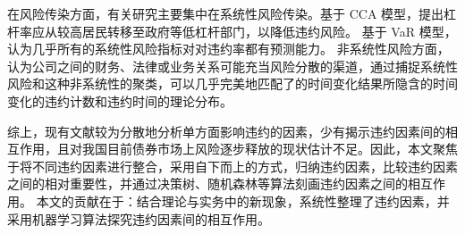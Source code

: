 在风险传染方面，有关研究主要集中在系统性风险传染。\Textcite{苟文均2016债务杠杆与系统性风险传染机制}基于 CCA 模型，提出杠杆率应从较高居民转移至政府等低杠杆部门，以降低违约风险。
\Textcite{2020Do}基于 VaR 模型，认为几乎所有的系统性风险指标对对违约率都有预测能力。
非系统性风险方面，\Textcite{azizpour2018exploring}认为公司之间的财务、法律或业务关系可能充当风险分散的渠道，通过捕捉系统性风险和这种非系统性的聚类，可以几乎完美地匹配了的时间变化结果所隐含的时间变化的违约计数和违约时间的理论分布。

综上，现有文献较为分散地分析单方面影响违约的因素，少有揭示违约因素间的相互作用，且对我国目前债券市场上风险逐步释放的现状估计不足。因此，本文聚焦于将不同违约因素进行整合，采用自下而上的方式，归纳违约因素，比较违约因素之间的相对重要性，并通过决策树、随机森林等算法刻画违约因素之间的相互作用。
本文的贡献在于：结合理论与实务中的新现象，系统性整理了违约因素，并采用机器学习算法探究违约因素间的相互作用。

